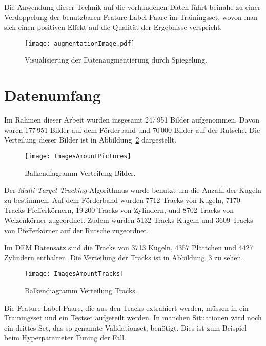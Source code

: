 Die Anwendung dieser Technik auf die vorhandenen Daten führt beinahe zu einer Verdoppelung 
der benutzbaren Feature-Label-Paare im Trainingsset, wovon man sich einen positiven Effekt auf die Qualität der Ergebnisse verspricht.

\begin{figure}[h]
	\centering
	\texttt{[image: augmentationImage.pdf]}
	\caption{Visualisierung der Datenaugmentierung durch Spiegelung.}
	\label{fig:dataAugm}
\end{figure}



\section{Datenumfang}

Im Rahmen dieser Arbeit wurden insgesamt 247\,951 Bilder aufgenommen.
Davon waren 177\,951 Bilder auf dem Förderband und 70\,000 Bilder auf der Rutsche.
Die Verteilung dieser Bilder ist in Abbildung~\ref{fig:barPics} dargestellt.

\begin{figure}[h]
	\centering
	\texttt{[image: ImagesAmountPictures]}
	\caption{Balkendiagramm Verteilung Bilder.}
	\label{fig:barPics}
\end{figure}

Der \textit{Multi-Target-Tracking}-Algorithmus wurde benutzt um die Anzahl der Kugeln zu bestimmen.
Auf dem Förderband wurden 7712 Tracks von Kugeln,
7170 Tracks Pfefferkörnern,
19\,200 Tracks von Zylindern,
und 8702 Tracks von Weizenkörner zugeordnet.
Zudem wurden 5132 Tracks Kugeln und 3609 Tracks von Pfefferkörner auf der Rutsche zugeordnet.

Im DEM Datensatz sind die Tracks von 3713 Kugeln, 4357 Plättchen und 4427 Zylindern enthalten.
Die Verteilung der Tracks ist in Abbildung~\ref{fig:barTracks} zu sehen.

\begin{figure}[h]
	\centering
	\texttt{[image: ImagesAmountTracks]}
	\caption{Balkendiagramm Verteilung Tracks.}
	\label{fig:barTracks}
\end{figure}

Die Feature-Label-Paare, die aus den Tracks extrahiert werden, 
müssen in ein Trainingsset und ein Testset aufgeteilt werden.
In manchen Situationen wird noch ein drittes Set, das so genannte Validationset, benötigt.
Dies ist zum Beispiel beim Hyperparameter Tuning der Fall.

